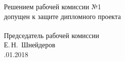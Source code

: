 \newpage
\begin{titlepage}
    \null
    \vfill
    \begin{flushleft}
      \begin{minipage}{0.5\textwidth}
        Решением рабочей комиссии №1\\
        допущен к защите дипломного проекта\\
        \\
        Председатель рабочей комиссии\\
        \underline{\hspace*{2.8cm}} Е.\,Н.~Шнейдеров \\
        \underline{\hspace*{1.2cm}}.01.2018
      \end{minipage}\\[2.2em]
    \end{flushleft}
\end{titlepage}


\pagestyle{empty}
\newpage


\newpage
\pagestyle{fancy}